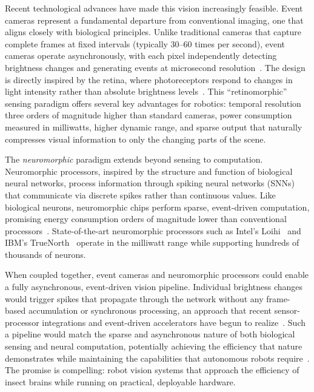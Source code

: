 
Recent technological advances have made this vision increasingly feasible. Event cameras represent a fundamental departure from conventional imaging, one that aligns closely with biological principles. Unlike traditional cameras that capture complete frames at fixed intervals (typically 30--60 times per second), event cameras operate asynchronously, with each pixel independently detecting brightness changes and generating events at microsecond resolution~\cite{gallego2020eventbased}. The design is directly inspired by the retina, where photoreceptors respond to changes in light intensity rather than absolute brightness levels~\cite{posch2014retinomorphic}. This ``retinomorphic'' sensing paradigm offers several key advantages for robotics: temporal resolution three orders of magnitude higher than standard cameras, power consumption measured in milliwatts, higher dynamic range, and sparse output that naturally compresses visual information to only the changing parts of the scene.

The \emph{neuromorphic} paradigm extends beyond sensing to computation. Neuromorphic processors, inspired by the structure and function of biological neural networks, process information through spiking neural networks (SNNs) that communicate via discrete spikes rather than continuous values. Like biological neurons, neuromorphic chips perform sparse, event-driven computation, promising energy consumption orders of magnitude lower than conventional processors~\cite{davies2021advancing,merolla2014million}. State-of-the-art neuromorphic processors such as Intel's Loihi~\cite{davies2018loihi} and IBM's TrueNorth~\cite{merolla2014million} operate in the milliwatt range while supporting hundreds of thousands of neurons.

When coupled together, event cameras and neuromorphic processors could enable a fully asynchronous, event-driven vision pipeline. Individual brightness changes would trigger spikes that propagate through the network without any frame-based accumulation or synchronous processing, an approach that recent sensor-processor integrations and event-driven accelerators have begun to realize~\cite{richter2024speck,yang2025evgnn}. Such a pipeline would match the sparse and asynchronous nature of both biological sensing and neural computation, potentially achieving the efficiency that nature demonstrates while maintaining the capabilities that autonomous robots require~\cite{sandamirskaya2022neuromorphic}. The promise is compelling: robot vision systems that approach the efficiency of insect brains while running on practical, deployable hardware.

